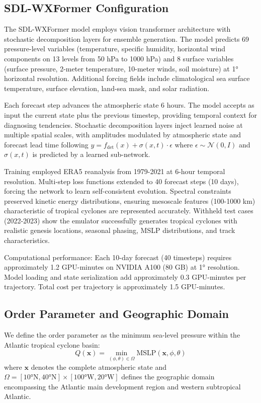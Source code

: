 \documentclass[11pt]{article}
\begin{document}
\subsection{SDL-WXFormer Configuration}

The SDL-WXFormer model employs vision transformer architecture with stochastic decomposition layers for ensemble generation. The model predicts 69 pressure-level variables (temperature, specific humidity, horizontal wind components on 13 levels from 50 hPa to 1000 hPa) and 8 surface variables (surface pressure, 2-meter temperature, 10-meter winds, soil moisture) at 1° horizontal resolution. Additional forcing fields include climatological sea surface temperature, surface elevation, land-sea mask, and solar radiation.

Each forecast step advances the atmospheric state 6 hours. The model accepts as input the current state plus the previous timestep, providing temporal context for diagnosing tendencies. Stochastic decomposition layers inject learned noise at multiple spatial scales, with amplitudes modulated by atmospheric state and forecast lead time following $y = f_{\text{det}}(x) + \sigma(x,t) \cdot \epsilon$ where $\epsilon \sim \mathcal{N}(0,I)$ and $\sigma(x,t)$ is predicted by a learned sub-network.

Training employed ERA5 reanalysis from 1979-2021 at 6-hour temporal resolution. Multi-step loss functions extended to 40 forecast steps (10 days), forcing the network to learn self-consistent evolution. Spectral constraints preserved kinetic energy distributions, ensuring mesoscale features (100-1000 km) characteristic of tropical cyclones are represented accurately. Withheld test cases (2022-2023) show the emulator successfully generates tropical cyclones with realistic genesis locations, seasonal phasing, MSLP distributions, and track characteristics.

Computational performance: Each 10-day forecast (40 timesteps) requires approximately 1.2 GPU-minutes on NVIDIA A100 (80 GB) at 1° resolution. Model loading and state serialization add approximately 0.3 GPU-minutes per trajectory. Total cost per trajectory is approximately 1.5 GPU-minutes.

\subsection{Order Parameter and Geographic Domain}

We define the order parameter as the minimum sea-level pressure within the Atlantic tropical cyclone basin:
\begin{equation}
Q(\mathbf{x}) = \min_{(\phi,\theta) \in \Omega} \text{MSLP}(\mathbf{x}, \phi, \theta)
\end{equation}
where $\mathbf{x}$ denotes the complete atmospheric state and $\Omega = [10°\text{N}, 40°\text{N}] \times [100°\text{W}, 20°\text{W}]$ defines the geographic domain encompassing the Atlantic main development region and western subtropical Atlantic.
\end{document}
